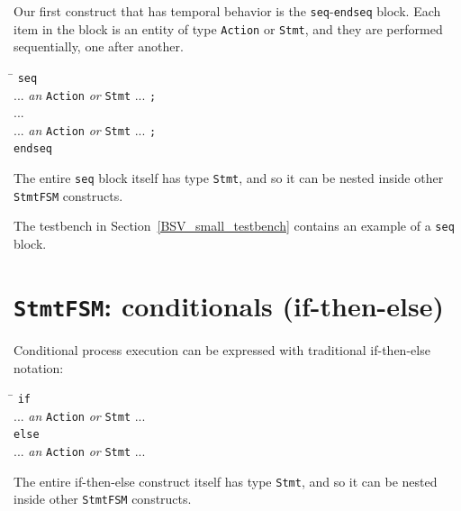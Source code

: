 
Our first construct that has temporal behavior is the
\verb|seq|-\verb|endseq| block.  Each item in the block is an entity
of type \verb|Action| or \verb|Stmt|, and they are performed
sequentially, one after another.

\begin{tabbing}
\hmm \= \hm \kill
\hmm \> {\tt seq} \\
     \> \hm    ... \emph{an} {\tt Action} \emph{or} {\tt Stmt} ... {\tt ;} \\
     \> \hm    ... \\
     \> \hm    ... \emph{an} {\tt Action} \emph{or} {\tt Stmt} ... {\tt ;} \\
     \> {\tt endseq}
\end{tabbing}


The entire \verb|seq| block itself has type \verb|Stmt|, and so it can
be nested inside other \verb|StmtFSM| constructs.

The testbench in Section~\ref{BSV_small_testbench} contains an example
of a \verb|seq| block.


\section{{\tt StmtFSM}: conditionals (if-then-else)}


Conditional process execution can be expressed with traditional
if-then-else notation:

\begin{tabbing}
\hmm \= \hm \kill
\hmm \> {\tt if} \\
     \> \hm    ... \emph{an} {\tt Action} \emph{or} {\tt Stmt} ... \\
     \> {\tt else} \\
     \> \hm    ... \emph{an} {\tt Action} \emph{or} {\tt Stmt} ... \\
\end{tabbing}

The entire if-then-else construct itself has type \verb|Stmt|, and so
it can be nested inside other \verb|StmtFSM| constructs.

